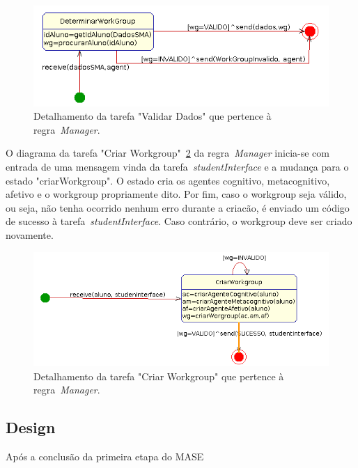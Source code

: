 \begin{figure}
	\centering
	\includegraphics[scale=0.48]{images/td-determinar-wg.png}
	\caption{Detalhamento da tarefa "Validar Dados" que pertence à regra~\emph{Manager}.}
	\label{fig:td-determinar-wg}
\end{figure}

O diagrama da tarefa "Criar Workgroup"~\ref{fig:td-criar-wg} da regra~\emph{Manager} inicia-se com entrada de uma mensagem vinda da tarefa~\emph{studentInterface} e a mudança para o estado "criarWorkgroup". O estado cria os agentes cognitivo, metacognitivo, afetivo e o workgroup propriamente dito. Por fim, caso o workgroup seja válido, ou seja, não tenha ocorrido nenhum erro durante a criacão, é enviado um código de sucesso à tarefa~\emph{studentInterface}. Caso contrário, o workgroup deve ser criado novamente.

\begin{figure}
	\centering
	\includegraphics[scale=0.48]{images/td-criar-wg.png}
	\caption{Detalhamento da tarefa "Criar Workgroup" que pertence à regra~\emph{Manager}.}
	\label{fig:td-criar-wg}
\end{figure}


















\subsection{Design}\label{subsection:design}

Após a conclusão da primeira etapa do MASE
